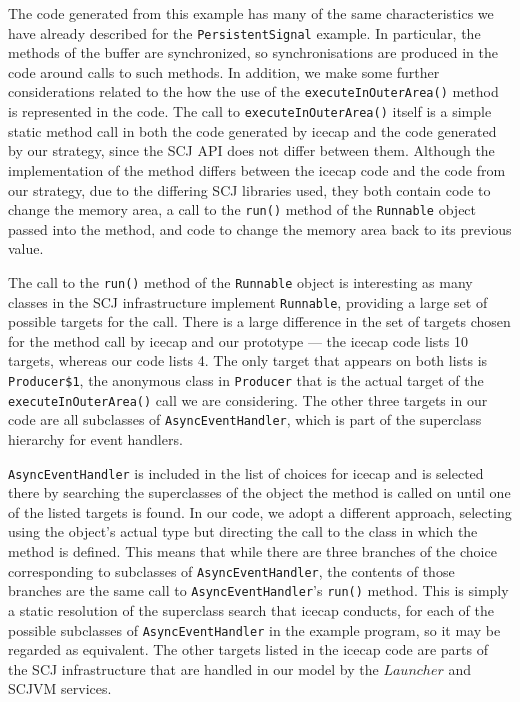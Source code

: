 The code generated from this example has many of the same
characteristics we have already described for the
\texttt{PersistentSignal} example.
In particular, the methods of the buffer are synchronized, so
synchronisations are produced in the code around calls to such
methods.
In addition, we make some further considerations related to the how
the use of the \texttt{executeInOuterArea()} method is represented in
the code.
The call to \texttt{executeInOuterArea()} itself is a simple static
method call in both the code generated by icecap and the code
generated by our strategy, since the SCJ API does not differ between
them.
Although the implementation of the method differs between the icecap
code and the code from our strategy, due to the differing SCJ
libraries used, they both contain code to change the memory area, a
call to the \texttt{run()} method of the \texttt{Runnable} object
passed into the method, and code to change the memory area back to its
previous value.

The call to the \texttt{run()} method of the \texttt{Runnable} object
is interesting as many classes in the SCJ infrastructure implement
\texttt{Runnable}, providing a large set of possible targets for the
call.
There is a large difference in the set of targets chosen for the
method call by icecap and our prototype --- the icecap code lists 10
targets, whereas our code lists 4.
The only target that appears on both lists is \texttt{Producer\$1},
the anonymous class in \texttt{Producer} that is the actual target of
the \texttt{executeInOuterArea()} call we are considering.
The other three targets in our code are all subclasses of
\texttt{AsyncEventHandler}, which is part of the superclass hierarchy
for event handlers. 

\texttt{AsyncEventHandler} is included in the list of choices for
icecap and is selected there by searching the superclasses of the
object the method is called on until one of the listed targets is
found.
In our code, we adopt a different approach, selecting using the
object's actual type but directing the call to the class in which the
method is defined.
This means that while there are three branches of the choice
corresponding to subclasses of \texttt{AsyncEventHandler}, the
contents of those branches are the same call to
\texttt{AsyncEventHandler}'s \texttt{run()} method.
This is simply a static resolution of the superclass search that
icecap conducts, for each of the possible subclasses of
\texttt{AsyncEventHandler} in the example program, so it may be
regarded as equivalent.
The other targets listed in the icecap code are parts of the SCJ
infrastructure that are handled in our model by the $Launcher$ and
SCJVM services.

